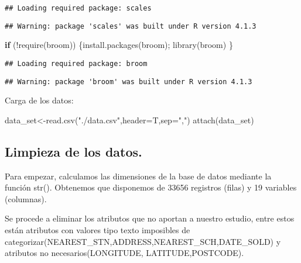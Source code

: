 \documentclass[
]{article}
\newenvironment{Shaded}{\begin{snugshade}}{\end{snugshade}}
\newcommand{\AttributeTok}[1]{\textcolor[rgb]{0.77,0.63,0.00}{#1}}
\newcommand{\ControlFlowTok}[1]{\textcolor[rgb]{0.13,0.29,0.53}{\textbf{#1}}}
\newcommand{\FunctionTok}[1]{\textcolor[rgb]{0.00,0.00,0.00}{#1}}
\newcommand{\NormalTok}[1]{#1}
\newcommand{\OtherTok}[1]{\textcolor[rgb]{0.56,0.35,0.01}{#1}}
\newcommand{\SpecialCharTok}[1]{\textcolor[rgb]{0.00,0.00,0.00}{#1}}
\newcommand{\StringTok}[1]{\textcolor[rgb]{0.31,0.60,0.02}{#1}}
\begin{document}
\begin{verbatim}
## Loading required package: scales
\end{verbatim}

\begin{verbatim}
## Warning: package 'scales' was built under R version 4.1.3
\end{verbatim}

\begin{Shaded}
\begin{Highlighting}[]
\ControlFlowTok{if}\NormalTok{ (}\SpecialCharTok{!}\FunctionTok{require}\NormalTok{(}\StringTok{\textquotesingle{}broom\textquotesingle{}}\NormalTok{)) \{}\FunctionTok{install.packages}\NormalTok{(}\StringTok{\textquotesingle{}broom\textquotesingle{}}\NormalTok{); }\FunctionTok{library}\NormalTok{(}\StringTok{\textquotesingle{}broom\textquotesingle{}}\NormalTok{)}
\NormalTok{\}}
\end{Highlighting}
\end{Shaded}

\begin{verbatim}
## Loading required package: broom
\end{verbatim}

\begin{verbatim}
## Warning: package 'broom' was built under R version 4.1.3
\end{verbatim}

Carga de los datos:

\begin{Shaded}
\begin{Highlighting}[]
\NormalTok{data\_set}\OtherTok{\textless{}{-}}\FunctionTok{read.csv}\NormalTok{(}\StringTok{"./data.csv"}\NormalTok{,}\AttributeTok{header=}\NormalTok{T,}\AttributeTok{sep=}\StringTok{","}\NormalTok{)}
\FunctionTok{attach}\NormalTok{(data\_set)}
\end{Highlighting}
\end{Shaded}

\hypertarget{limpieza-de-los-datos.}{%
\subsection{Limpieza de los datos.}\label{limpieza-de-los-datos.}}

Para empezar, calculamos las dimensiones de la base de datos mediante la
función str(). Obtenemos que disponemos de 33656 registros (filas) y 19
variables (columnas).

Se procede a eliminar los atributos que no aportan a nuestro estudio,
entre estos están atributos con valores tipo texto imposibles de
categorizar(NEAREST\_STN,ADDRESS,NEAREST\_SCH,DATE\_SOLD) y atributos no
necesarios(LONGITUDE, LATITUDE,POSTCODE).
\end{document}
